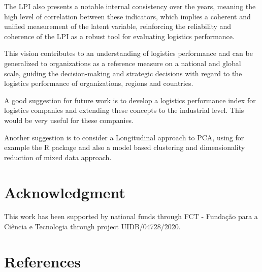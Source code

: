 \documentclass[conference]{IEEEtran}
\begin{document}
The LPI also presents a notable internal consistency over the years, meaning the high level of correlation between these indicators, which  implies a coherent and unified measurement of the latent variable, reinforcing the reliability and coherence of the LPI as a robust tool for evaluating logistics performance.

This vision contributes to an understanding of logistics performance and can be generalized to organizations as a reference measure on a national and global scale, guiding the decision-making and strategic decisions with regard to the logistics performance of organizations, regions and countries.

A good suggestion for future work is to develop a logistics performance index for logistics companies and extending these concepts to the industrial level. This would be very useful for these companies. 

Another suggestion is to consider a Longitudinal approach to PCA, using for example the R package \cite{jarmund2022alasca} and also a model based clustering and dimensionality reduction of mixed data \cite{ranalli2017model} approach.




\section*{Acknowledgment}

This work has been supported by national funds through FCT - Fundação para a Ciência e Tecnologia through project UIDB/04728/2020.

\section*{References}





\end{document}
